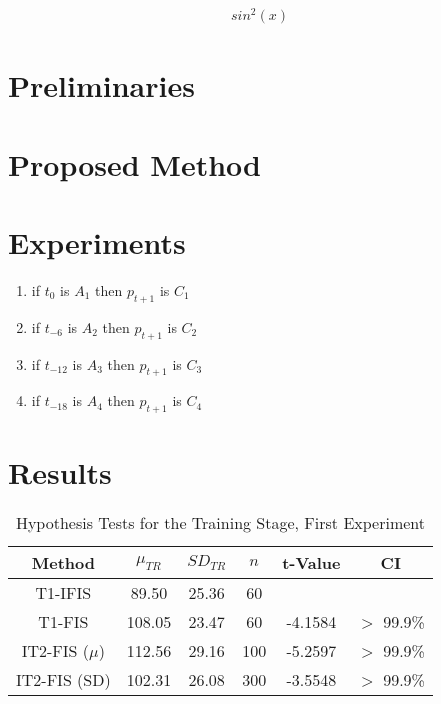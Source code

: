\documentclass[conference]{IEEEtran}
\begin{document}
\begin{equation}
  \label{squared-sine}
  \begin{aligned}
    sin^2(x)
\end{aligned}
\end{equation}



\section{Preliminaries}
\label{preliminaries}

\section{Proposed Method}
\label{proposed-method}


\section{Experiments}
\label{experiments}

\begin{enumerate}
  \item if $t_{0}$ is $A_{1}$ then $p_{t+1}$ is $C_{1}$
  \item if $t_{-6}$ is $A_{2}$ then $p_{t+1}$ is $C_{2}$
  \item if $t_{-12}$ is $A_{3}$ then $p_{t+1}$ is $C_{3}$
  \item if $t_{-18}$ is $A_{4}$ then $p_{t+1}$ is $C_{4}$
\end{enumerate}

\section{Results}
\label{results}

\begin{table}[!t]
  \renewcommand{\arraystretch}{1.3}
  \caption{Hypothesis Tests for the Training Stage, First Experiment}
  \label{first-hypothesis-tests-training}
  \centering
  \begin{tabular}{|c|c|c|c|c|c|}
    \hline
    Method & $\mu_{TR}$ & $SD_{TR}$ & $n$ & t-Value & CI \\
    \hline
    T1-IFIS & 89.50 & 25.36 & 60 &  & \\
    \hline
    T1-FIS & 108.05 & 23.47 & 60 & -4.1584 & $>$ 99.9\% \\
    \hline
    IT2-FIS (\(\mu\)) & 112.56 & 29.16 & 100 & -5.2597 & $>$ 99.9\% \\
    \hline
    IT2-FIS (SD) & 102.31 & 26.08 & 300 & -3.5548 & $>$ 99.9\% \\
    \hline
  \end{tabular}
\end{table}
\end{document}
